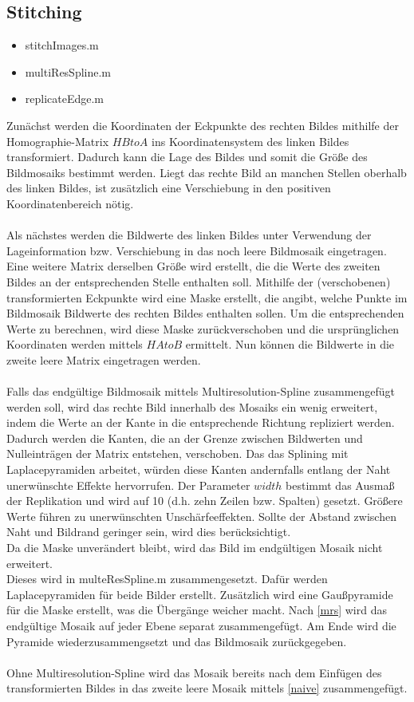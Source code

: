 \documentclass[deutsch]{scrartcl}
\begin{document}
\subsection{Stitching}
\begin{itemize}
	\item stitchImages.m 
	\item multiResSpline.m 
	\item replicateEdge.m
\end{itemize}
Zunächst werden die Koordinaten der Eckpunkte des rechten Bildes mithilfe der Homographie-Matrix $HBtoA$ ins Koordinatensystem des linken Bildes transformiert. Dadurch kann die Lage des Bildes und somit die Größe des Bildmosaiks bestimmt werden. Liegt das rechte Bild an manchen Stellen oberhalb des linken Bildes, ist zusätzlich eine Verschiebung in den positiven Koordinatenbereich nötig. \\\\
Als nächstes werden die Bildwerte des linken Bildes unter Verwendung der Lageinformation bzw. Verschiebung in das noch leere Bildmosaik eingetragen. \\
Eine weitere Matrix derselben Größe wird erstellt, die die Werte des zweiten Bildes an der entsprechenden Stelle enthalten soll. Mithilfe der (verschobenen) transformierten Eckpunkte wird eine Maske erstellt, die angibt, welche Punkte im Bildmosaik Bildwerte des rechten Bildes enthalten sollen. Um die entsprechenden Werte zu berechnen, wird diese Maske zurückverschoben und die ursprünglichen Koordinaten werden mittels $HAtoB$ ermittelt. Nun können die Bildwerte in die zweite leere Matrix eingetragen werden. \\\\
Falls das endgültige Bildmosaik mittels Multiresolution-Spline zusammengefügt werden soll, wird das rechte Bild innerhalb des Mosaiks ein wenig erweitert, indem die Werte an der Kante in die entsprechende Richtung repliziert werden. Dadurch werden die Kanten, die an der Grenze zwischen Bildwerten und Nulleinträgen der Matrix entstehen, verschoben. Das das Splining mit Laplacepyramiden arbeitet, würden diese Kanten andernfalls entlang der Naht unerwünschte Effekte hervorrufen. Der Parameter $width$ bestimmt das Ausmaß der Replikation und wird auf 10 (d.h. zehn Zeilen bzw. Spalten) gesetzt. Größere Werte führen zu unerwünschten Unschärfeeffekten. Sollte der Abstand zwischen Naht und Bildrand geringer sein, wird dies berücksichtigt. \\
 Da die Maske unverändert bleibt, wird das Bild im endgültigen Mosaik nicht erweitert. \\
Dieses wird in multeResSpline.m zusammengesetzt. Dafür werden Laplacepyramiden für beide Bilder erstellt. Zusätzlich wird eine Gaußpyramide für die Maske erstellt, was die Übergänge weicher macht. Nach \eqref{mrs} wird das endgültige Mosaik auf jeder Ebene separat zusammengefügt. Am Ende wird die Pyramide wiederzusammengsetzt und das Bildmosaik zurückgegeben. \\\\
Ohne Multiresolution-Spline wird das Mosaik bereits nach dem Einfügen des transformierten Bildes in das zweite leere Mosaik mittels \eqref{naive} zusammengefügt.
\end{document}
